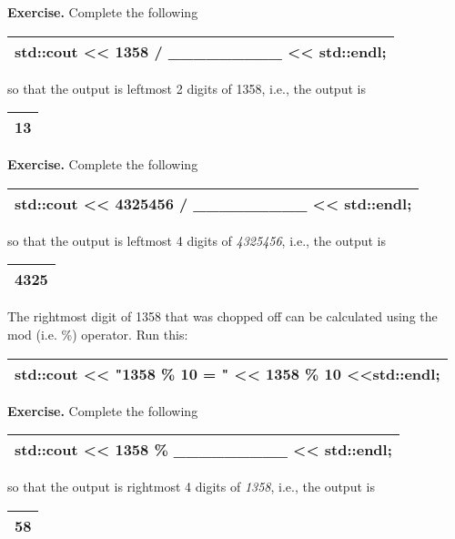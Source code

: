 \documentclass[
]{article}
\begin{document}
\textbf{Exercise.} Complete the following

\begin{longtable}[]{@{}l@{}}
\toprule
\endhead
std::cout \textless\textless{} 1358 / \_\_\_\_\_\_\_\_\_
\textless\textless{} std::endl;\tabularnewline
\bottomrule
\end{longtable}

so that the output is leftmost 2 digits of 1358, i.e., the output is

\begin{longtable}[]{@{}l@{}}
\toprule
\endhead
13\tabularnewline
\bottomrule
\end{longtable}

\textbf{Exercise.} Complete the following

\begin{longtable}[]{@{}l@{}}
\toprule
\endhead
std::cout \textless\textless{} 4325456 / \_\_\_\_\_\_\_\_\_
\textless\textless{} std::endl;\tabularnewline
\bottomrule
\end{longtable}

so that the output is leftmost 4 digits of \emph{4325456}, i.e., the
output is

\begin{longtable}[]{@{}l@{}}
\toprule
\endhead
4325\tabularnewline
\bottomrule
\end{longtable}

The rightmost digit of 1358 that was chopped off can be calculated using
the mod (i.e. \%) operator. Run this:

\begin{longtable}[]{@{}l@{}}
\toprule
\endhead
std::cout \textless\textless{} "1358 \% 10 = " \textless\textless{} 1358
\% 10 \textless\textless std::endl;\tabularnewline
\bottomrule
\end{longtable}

\textbf{Exercise.} Complete the following

\begin{longtable}[]{@{}l@{}}
\toprule
\endhead
std::cout \textless\textless{} 1358 \% \_\_\_\_\_\_\_\_\_
\textless\textless{} std::endl;\tabularnewline
\bottomrule
\end{longtable}

so that the output is rightmost 4 digits of \emph{1358}, i.e., the
output is

\begin{longtable}[]{@{}l@{}}
\toprule
\endhead
58\tabularnewline
\bottomrule
\end{longtable}
\end{document}
